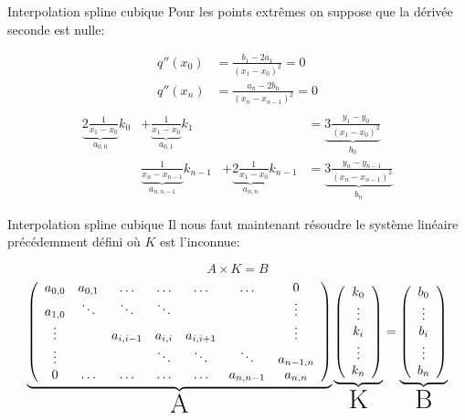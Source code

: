 \documentclass{beamer}
\begin{document}
\begin{frame}{Interpolation spline cubique}
Pour les points extrêmes on suppose que la dérivée seconde est nulle:\\
\begin{overprint}
\begin{align*}
q''(x_0)&=\frac{b_1 -2 a_1}{(x_1-x_0)^2}=0\\
q''(x_n)&=\frac{a_n -2 b_n}{(x_n-x_{n-1})^2}=0\\
\end{align*}
\begin{align*}
\underbrace{2\frac{1}{x_{1}-x_{0}}  }_{a_{0,0}} k_{0}&+\underbrace{\frac{1}{x_{1}-x_{0}}}_{a_{0,1}}k_{1}&&=\underbrace{3\frac{y_{1}-y_{0}}{(x_{1}-x_{0})^2}}_{b_0}\\
&\underbrace{\frac{1}{x_{n}-x_{n-1}}}_{a_{n,n-1}}k_{n-1}&+\underbrace{2\frac{1}{x_{1}-x_{0}}}_{a_{n,n}} k_{n-1} &=\underbrace{3\frac{y_{n}-y_{n-1}}{(x_{n}-x_{n-1})^2}}_{b_n}
\end{align*}
\end{overprint}
\end{frame}
\begin{frame}{Interpolation spline cubique}
Il nous faut maintenant résoudre le système linéaire précédemment défini où $K$ est l'inconnue:\\
\begin{overprint}
\Huge
\[
A \times K = B
\]
\footnotesize
\[
\underbrace{\left( 
\begin{array}{ccccccc}
a_{0,0} & a_{0,1} & \hdots & \hdots & \hdots & \hdots & 0 \\
a_{1,0} & \ddots & \ddots & \ddots  &  &  & \vdots  \\
\vdots & & a_{i,i-1} & a_{i,i} & a_{i,i+1} & & \vdots \\
\vdots & & & \ddots & \ddots & \ddots & a_{n-1,n}\\
0 & \hdots & \hdots & \hdots & \hdots & a_{n,n-1} & a_{n,n} 
\end{array}
\right)}_{\text{\huge A}}
\underbrace{\left(
\begin{array}{c}
k_0\\
\vdots\\
k_i\\
\vdots\\
k_n\\
\end{array}
\right)}_{\text{\huge K}}
=
\underbrace{\left(
\begin{array}{c}
b_0\\
\vdots\\
b_i\\
\vdots\\
b_n\\
\end{array}
\right)}_{\text{\huge B}}
\]
\end{overprint}
\end{frame}
\end{document}
